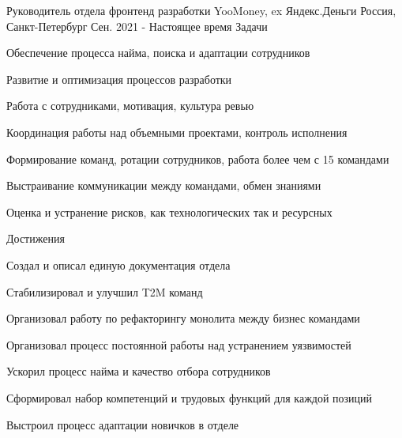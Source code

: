 
\begin{cventries}

  \cvmultientry
    {Руководитель отдела фронтенд разработки}
    {YooMoney, ex Яндекс.Деньги}
    {Россия, Санкт-Петербург}
    {Сен. 2021 - Настоящее время}
    {Задачи}
    {
      \begin{cvitems}
        \item {Обеспечение процесса найма, поиска и адаптации сотрудников}
        \item {Развитие и оптимизация процессов разработки}
        \item {Работа с сотрудниками, мотивация, культура ревью}
        \item {Координация работы над объемными проектами, контроль исполнения}
        \item {Формирование команд, ротации сотрудников, работа более чем с 15 командами}
        \item {Выстраивание коммуникации между командами, обмен знаниями}
        \item {Оценка и устранение рисков, как технологических так и ресурсных}
      \end{cvitems}
    }
    {Достижения}
    {
      \begin{cvitems}
        \item {Создал и описал единую документация отдела}
        \item {Стабилизировал и улучшил T2M команд}
        \item {Организовал работу по рефакторингу монолита между бизнес командами}
        \item {Организовал процесс постоянной работы над устранением уязвимостей}
        \item {Ускорил процесс найма и качество отбора сотрудников}
        \item {Сформировал набор компетенций и трудовых функций для каждой позиций}
        \item {Выстроил процесс адаптации новичков в отделе}
      \end{cvitems}
    }


\end{cventries}
